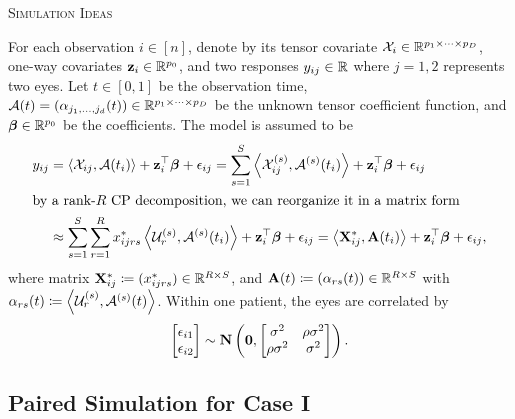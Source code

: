 \documentclass[10pt]{notes}
\begin{document}
\thispagestyle{firstpage}
\begin{center}
    \large\textsc{Simulation Ideas}
\end{center}

For each observation $i\in [n]$, denote by its tensor covariate $\mathcal{X}_i\in\mathbb{R}^{p_1\times\cdots\times p_D}$, one-way covariates $\mathbf{z}_i\in\mathbb{R}^{p_0}$, and two responses $y_{ij}\in\mathbb{R}$ where $j=1,2$ represents two eyes. Let $t\in[0,1]$ be the observation time, $\mathcal{A}(t)=(\alpha_{j_1,\dots,j_d}(t))\in\mathbb{R}^{p_1\times\cdots\times p_D}$ be the unknown tensor coefficient function, and $\bm{\beta}\in\mathbb{R}^{p_0}$ be the coefficients. The model is assumed to be
\begin{align}
\label{eq-model0}
y_{ij}
&= \left\langle \mathcal{X}_{ij}, \mathcal{A}(t_i) \right\rangle
   + \mathbf{z}_i^\top \boldsymbol{\beta}
   + \epsilon_{ij} = \sum_{s=1}^S
   \left\langle \mathcal{X}_{ij}^{(s)}, \mathcal{A}^{(s)}(t_i) \right\rangle
   + \mathbf{z}_i^\top \boldsymbol{\beta}
   + \epsilon_{ij} \\
\intertext{by a rank-$R$ CP decomposition, we can reorganize it in a matrix form}
&\approx \sum_{s=1}^S \sum_{r=1}^R
   x_{ijrs}^{*}
   \left\langle
   \mathcal{U}_r^{(s)},
   \mathcal{A}^{(s)}(t_i)
   \right\rangle
   + \mathbf{z}_i^\top \boldsymbol{\beta}
   + \epsilon_{ij} 
   = \left\langle \mathbf{X}_{ij}^{*}, \mathbf{A}(t_i) \right\rangle
   + \mathbf{z}_i^\top \boldsymbol{\beta}
   + \epsilon_{ij},
   \nonumber
\end{align}
where matrix $\mathbf{X}_{ij}^{*}\coloneq(x_{ijrs}^*)\in\mathbb{R}^{R\times S}$, and $\mathbf{A}(t)\coloneq (\alpha_{rs}(t))\in\mathbb{R}^{R\times S}$ with $\alpha_{rs}(t)\coloneq \left\langle \mathcal{U}_r^{(s)}, \mathcal{A}^{(s)}(t) \right\rangle$. Within one patient, the eyes are correlated by
\begin{align*}
    \begin{bmatrix}
        \epsilon_{i1}\\ \epsilon_{i2}
    \end{bmatrix}\sim 
    \bm{\mathrm{N}}\begin{pmatrix}
        \mathbf{0},\begin{bmatrix}
            \sigma^2 & \rho\sigma^2\\ 
            \rho\sigma^2 & \sigma^2
        \end{bmatrix}
    \end{pmatrix}.
\end{align*}

\subsection{Paired Simulation for Case I}
\end{document}
